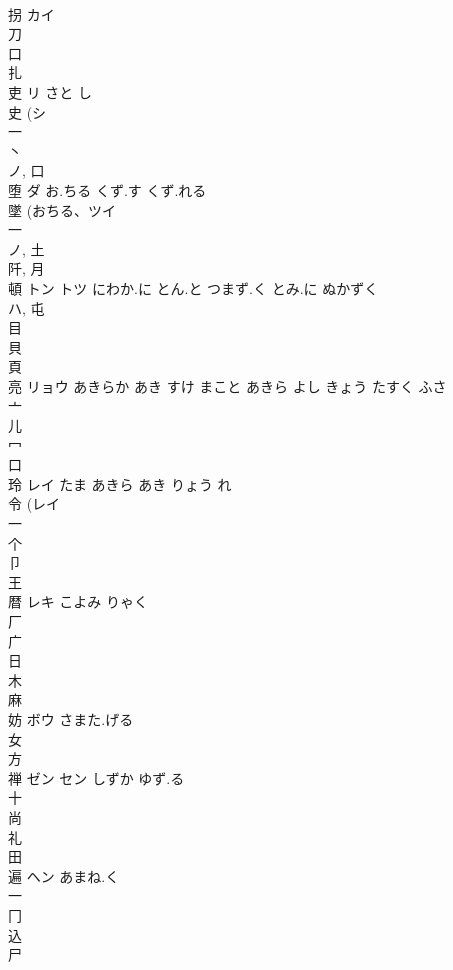 \documentclass[8pt]{extreport}
\begin{document}
\begin{CJK}{UTF8}{min}
\\	拐	カイ		
\\	刀 
\\	口 
\\	扎	
\\	吏	リ	さと し	
\\	史 (シ 
\\	一 
\\	丶 
\\	ノ, 口 
\\	堕	ダ	お.ちる くず.す くず.れる	
\\	墜 (おちる、ツイ 
\\	一 
\\	ノ, 土 
\\	阡, 月 
\\	頓	トン トツ	にわか.に とん.と つまず.く とみ.に ぬかずく	
\\	ハ, 屯 
\\	目 
\\	貝 
\\	頁 
\\	亮	リョウ	あきらか あき すけ まこと あきら よし きょう たすく ふさ	
\\	亠 
\\	儿 
\\	冖 
\\	口 
\\	玲	レイ	たま あきら あき りょう れ	
\\	令 (レイ 
\\	一 
\\	个 
\\	卩 
\\	王 
\\	暦	レキ	こよみ りゃく	
\\	厂 
\\	广 
\\	日 
\\	木 
\\	麻 
\\	妨	ボウ	さまた.げる	
\\	女 
\\	方 
\\	禅	ゼン セン	しずか ゆず.る	
\\	十 
\\	尚 
\\	礼 
\\	田 
\\	遍	ヘン	あまね.く	
\\	一 
\\	冂 
\\	込 
\\	尸 

\end{CJK}
\end{document}
